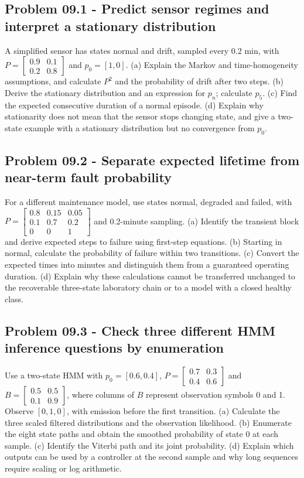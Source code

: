 \documentclass[11pt,a4paper]{article}
\begin{document}
\subsection{Problem 09.1 - Predict sensor regimes and interpret a stationary distribution}
A simplified sensor has states normal and drift, sampled every 0.2 min, with $P=\left[\begin{smallmatrix}0.9&0.1\\0.2&0.8\end{smallmatrix}\right]$ and $p_0=[1,0]$. (a) Explain the Markov and time-homogeneity assumptions, and calculate $P^2$ and the probability of drift after two steps. (b) Derive the stationary distribution and an expression for $p_n$; calculate $p_5$. (c) Find the expected consecutive duration of a normal episode. (d) Explain why stationarity does not mean that the sensor stops changing state, and give a two-state example with a stationary distribution but no convergence from $p_0$.

\subsection{Problem 09.2 - Separate expected lifetime from near-term fault probability}
For a different maintenance model, use states normal, degraded and failed, with $P=\left[\begin{smallmatrix}0.8&0.15&0.05\\0.1&0.7&0.2\\0&0&1\end{smallmatrix}\right]$ and 0.2-minute sampling. (a) Identify the transient block and derive expected steps to failure using first-step equations. (b) Starting in normal, calculate the probability of failure within two transitions. (c) Convert the expected times into minutes and distinguish them from a guaranteed operating duration. (d) Explain why these calculations cannot be transferred unchanged to the recoverable three-state laboratory chain or to a model with a closed healthy class.

\subsection{Problem 09.3 - Check three different HMM inference questions by enumeration}
Use a two-state HMM with $p_0=[0.6,0.4]$, $P=\left[\begin{smallmatrix}0.7&0.3\\0.4&0.6\end{smallmatrix}\right]$ and $B=\left[\begin{smallmatrix}0.5&0.5\\0.1&0.9\end{smallmatrix}\right]$, where columns of $B$ represent observation symbols 0 and 1. Observe $[0,1,0]$, with emission before the first transition. (a) Calculate the three scaled filtered distributions and the observation likelihood. (b) Enumerate the eight state paths and obtain the smoothed probability of state 0 at each sample. (c) Identify the Viterbi path and its joint probability. (d) Explain which outputs can be used by a controller at the second sample and why long sequences require scaling or log arithmetic.
\end{document}
